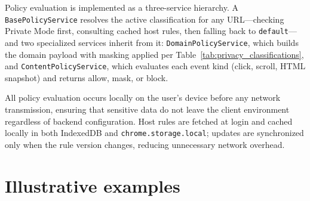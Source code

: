 \documentclass[preprint,12pt,a4paper]{elsarticle}
\begin{document}
\begin{table}[htbp]
    \centering
    \small
    \caption{Content event data collection by privacy policy classification.}
    \label{tab:collection_matrix}

\end{table}

 Policy evaluation is implemented as a three-service hierarchy. A \texttt{Base\allowbreak Policy\allowbreak Service} resolves the active classification for any URL---checking Private Mode first, consulting cached host rules, then falling back to \texttt{default}---and two specialized services inherit from it: \texttt{DomainPolicyService}, which builds the domain payload with masking applied per Table~\ref{tab:privacy_classifications}, and \texttt{Content\allowbreak Policy\allowbreak Service}, which evaluates each event kind (click, scroll, HTML snapshot) and returns allow, mask, or block.

 All policy evaluation occurs locally on the user’s device before any network transmission, ensuring that sensitive data do not leave the client environment regardless of backend configuration. Host rules are fetched at login and cached locally in both IndexedDB and \texttt{chrome.storage.local}; updates are synchronized only when the rule version changes, reducing unnecessary network overhead.

  \section{Illustrative examples}
\end{document}
